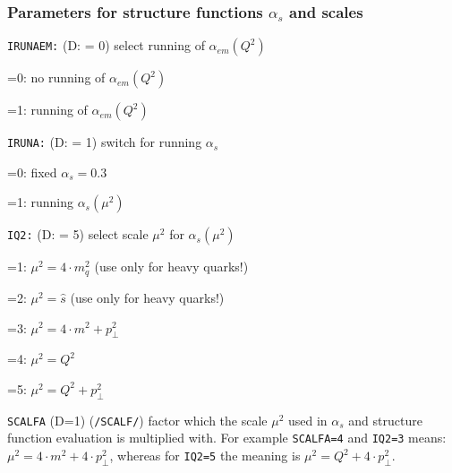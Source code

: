 \documentclass[10pt]{article} \usepackage{dina4}
\newcommand{\deflab}[1]{#1\hfil}%
\newenvironment{defl}[1]%
  {\begin{list}{}{\settowidth{\labelwidth}{#1}%
  \setlength{\leftmargin}{\labelwidth}%
  \addtolength{\leftmargin}{\labelsep}%
  \setlength{\itemsep}{0pt plus 1pt}
  \setlength{\parsep}{0pt plus 1pt}
  \setlength{\topsep}{0pt plus 1pt}
  \setlength{\partopsep}{0pt plus 1pt}
  \setlength{\parskip}{2mm plus 1mm minus 1mm}
  \let\makelabel\deflab}}%
  {\end{list}}
\begin{document}
\subsubsection{Parameters for structure functions $\alpha_s$ and scales}
\begin{defl}{123456789012345}
\item[{\tt IRUNAEM:}] (D: = 0)
                   select running of $\alpha _{em}(Q^2)$
\item[]
                        =0:  no running of $\alpha _{em}(Q^2)$
\item[]
                        =1:  running of $\alpha _{em}(Q^2)$


\item[{\tt IRUNA:}] (D: = 1)
                        switch for running $\alpha _s$
\item[]
                        =0:  fixed $\alpha_s=0.3$ 
\item[]
                        =1: running $\alpha _s(\mu^2)$
\item[{\tt IQ2:}] (D: = 5)
                   select scale $\mu^2$ for $\alpha _s(\mu^2)$
\item[]
                        =1:  $\mu^2 = 4 \cdot m_{q} ^2$
                             (use only for heavy quarks!)
\item[]
                        =2:  $\mu^2 = \hat{s} $
                             (use only for heavy quarks!)
\item[]
                        =3:  $\mu^2 = 4 \cdot m^2 + p_{\perp} ^2$
                             
\item[]
                        =4:  $\mu^2 = Q^2$
                        
\item[]
                        =5:  $\mu^2 = Q^2 + p_{\perp} ^2$

\item[{\tt SCALFA}] (D=1) (\verb+/SCALF/+)
                     factor which the scale $\mu^2$ used 
                     in $\alpha_s$ and
                     structure function evaluation 
                     is multiplied with. For example 
			   \verb+SCALFA=4+ and \verb+IQ2=3+ means:
			   $\mu^2= 4\cdot m^2 + 4 \cdot p_{\perp} ^2$, whereas for 
			   \verb+IQ2=5+ the meaning is 
			   $\mu^2= Q^2 + 4 \cdot p_{\perp} ^2$.


\end{defl}
\end{document}
